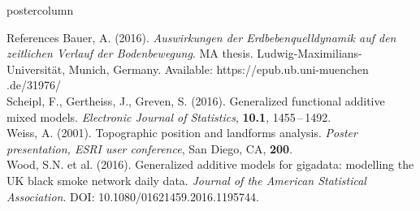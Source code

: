\documentclass[final,hyperref={pdfpagelabels=false}]{beamer}
\begin{document}
\begin{frame}
\begin{columns}
\begin{column}{1\textwidth}
\begin{columns}[T]
\begin{column}{.016\textwidth}
\end{column}

\end{columns}


\vspace{2ex}
\begin{beamercolorbox}[center,wd=\textwidth]{postercolumn}
\begin{minipage}[T]{.95\textwidth}  %
\begin{block}{\footnotesize References}
{\footnotesize %
Bauer, A. (2016). \textit{Auswirkungen der Erdbebenquelldynamik auf den zeitlich\-en Verlauf der Bodenbewegung}. MA thesis. Ludwig-Maximilians-Uni\-versi\-t\"{a}t, Munich, Germany. Available: https://epub.ub.uni-muenchen .de/31976/ \\
Scheipl, F., Gertheiss, J., Greven, S. (2016). Generalized functional additive mixed models. \textit{Electronic Journal of Statistics}, \textbf{10.1}, 1455\,--\,1492. \\
Weiss, A. (2001). Topographic position and landforms analysis. \textit{Poster presentation, ESRI user conference}, San Diego, CA, \textbf{200}. \\
Wood, S.N. et al. (2016). Generalized additive models for gigadata: modelling the UK black smoke network daily data. \textit{Journal of the American Statistical Association}. DOI: 10.1080/01621459.2016.1195744.
} %
\end{block}
\end{minipage}
\end{beamercolorbox}

\end{column} %
\end{columns}
\end{frame}
\end{document}
